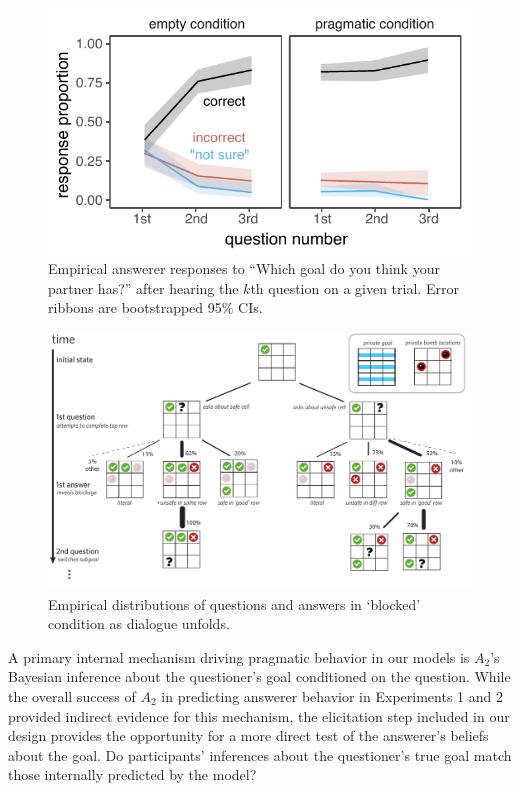 \documentclass[12pt, floatsintext, jou]{apa6}
\begin{document}
\begin{figure}[t!]
\begin{center}
\includegraphics[scale = .8]{Exp3/spatialGoalInference_final.pdf}
\end{center}
\caption{Empirical answerer responses to ``Which goal do you think your partner has?''  after hearing the $k$th question on a given trial. Error ribbons are bootstrapped 95\% CIs.}
\label{fig:exp3goalinference}
\end{figure}


\begin{figure}[t!]
\begin{center}
\includegraphics[scale = .6]{Exp3/blocked.pdf}
\end{center}
\caption{Empirical distributions of questions and answers in `blocked' condition as dialogue unfolds.}
\label{fig:blocked}
\end{figure}


A primary internal mechanism driving pragmatic behavior in our models is $A_2$'s Bayesian inference about the questioner's goal conditioned on the question. 
While the overall success of $A_2$ in predicting answerer behavior in Experiments 1 and 2 provided indirect evidence for this mechanism, the elicitation step included in our design provides the opportunity for a more direct test of the answerer's beliefs about the goal.
Do participants' inferences about the questioner's true goal match those internally predicted by the model?
\end{document}
